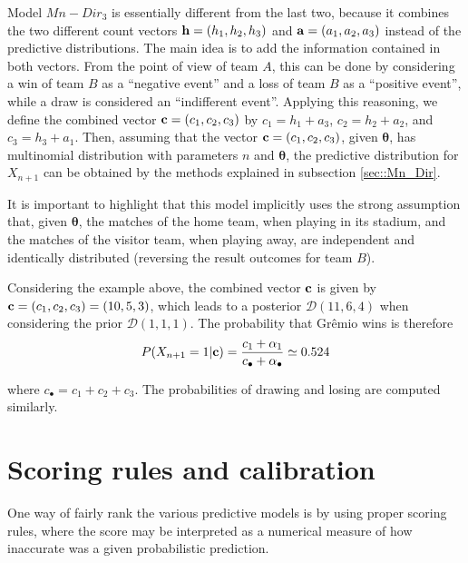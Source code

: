 \documentclass[journal,article,accept,moreauthors,pdftex,12pt,a4paper]{mdpi}
\begin{document}
	Model $Mn-Dir_3$ is essentially different from the
	last two, because it combines the two different count vectors ${\bf
		h} = (h_1, h_2, h_3)$ and ${\bf a} = (a_1, a_2, a_3)$ instead of the
	predictive distributions. The main idea is to add the information
	contained in both vectors. From the point of view of team $A$, this can
	be done by considering a win of team $B$ as a ``negative event'' and a
	loss of team $B$ as a ``positive event'', while a draw is
	considered an ``indifferent event''. Applying this reasoning,
	we define the combined vector ${\bf c} = (c_1, c_2, c_3)$ by $c_1 =
	h_1 + a_3$, $c_2 = h_2 + a_2$, and $c_3 = h_3 + a_1$. Then, assuming that the vector ${\bf c} = (c_1, c_2, c_3)$, given $\boldsymbol{\theta}$, has multinomial distribution with parameters $n$ and
	$\boldsymbol{\theta}$, the predictive distribution for $X_{n + 1}$ can
	be obtained by the methods explained in subsection
	\ref{sec::Mn_Dir}.
	
	It is important to highlight that this model implicitly uses the strong assumption that, given $\boldsymbol{\theta}$, the matches of the home team, when playing in its stadium, and the matches of the visitor team, when playing away, are independent and identically distributed (reversing the result outcomes for team $B$).
	
	Considering the example above, the combined vector ${\bf c}$ is given by ${\bf c}=(c_1,c_2,c_3)=(10,5,3)$, which leads to a posterior $\mathcal{D}(11,6,4)$ when considering the prior $\mathcal{D}(1,1,1)$.
	The probability that Gr\^emio wins is therefore
	\[P(X_{n+1}=1|{\bf c})=\frac{c_1+\alpha_1}{c_{\bullet}+\alpha_{\bullet}}\simeq0.524
	\]
	
	\noindent
	where $c_{\bullet}=c_1+c_2+c_3$. The probabilities of drawing and losing are computed similarly.
	
	\section{Scoring rules and calibration}
	\label{sec::scoring}
	
	One way of fairly rank the various predictive models is by using proper scoring rules, where
	the score may be interpreted as a numerical measure of how inaccurate was a given probabilistic prediction.
	
\end{document}

